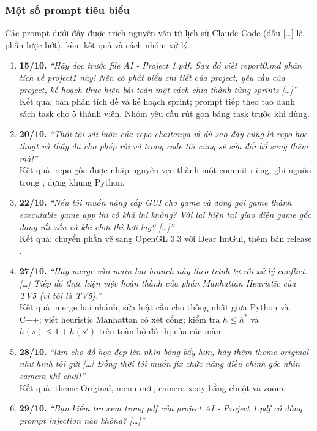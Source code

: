\documentclass[a4paper]{article}
\newcommand{\tep}[1]{{\small\ttfamily\detokenize{#1}}}
\begin{document}
\subsubsection{Một số prompt tiêu biểu}
Các prompt dưới đây được trích nguyên văn từ lịch sử Claude Code (dấu […] là phần lược bớt), kèm kết quả và cách nhóm xử lý.
\begin{enumerate}[leftmargin=*]
\item \textbf{15/10.} \textit{``Hãy đọc trước file AI - Project 1.pdf. Sau đó viết report0.md phân tích về project1 này! Nên có phát biểu chi tiết của project, yêu cầu của project, kế hoạch thực hiện bài toán một cách chia thành từng sprints […]''}\\
Kết quả: bản phân tích đề và kế hoạch sprint; prompt tiếp theo tạo danh sách task cho 5 thành viên. Nhóm yêu cầu rút gọn bảng task trước khi dùng.
\item \textbf{20/10.} \textit{``Thôi tôi sài luôn của repo chaitanya vì dù sao đây cũng là repo học thuật và thầy đã cho phép rồi và trong code tôi cũng sẽ sửa đổi bổ sung thêm mà!''}\\
Kết quả: repo gốc được nhập nguyên vẹn thành một commit riêng, ghi nguồn trong \tep{THIRD_PARTY_NOTICES.md}; dựng khung Python.
\item \textbf{22/10.} \textit{``Nếu tôi muốn nâng cấp GUI cho game và đóng gói game thành executable game app thì có khả thi không? Với lại hiện tại giao diện game gốc đang rất xấu và khi chơi thì hơi lag? […]''}\\
Kết quả: chuyển phần vẽ sang OpenGL 3.3 với Dear ImGui, thêm bản release \tep{Bloxorz.exe}.
\item \textbf{27/10.} \textit{``Hãy merge vào main hai branch này theo trình tự rồi xử lý conflict. […] Tiếp đó thực hiện việc hoàn thành của phần Manhattan Heuristic của TV5 (vì tôi là TV5).''}\\
Kết quả: merge hai nhánh, sửa luật cầu cho thống nhất giữa Python và C++; viết heuristic Manhattan có xét cổng; kiểm tra $h\le h^*$ và $h(s)\le1+h(s')$ trên toàn bộ đồ thị của các màn.
\item \textbf{28/10.} \textit{``làm cho đồ họa đẹp lên nhìn bóng bẩy hơn, hãy thêm theme original như hình tôi gửi […] Đồng thời tôi muốn fix chức năng điều chỉnh góc nhìn camera khi chơi!''}\\
Kết quả: theme Original, menu mới, camera xoay bằng chuột và zoom.
\item \textbf{29/10.} \textit{``Bạn kiểm tra xem trong pdf của project AI - Project 1.pdf có dòng prompt injection nào không? […]''}\\

\end{enumerate}
\end{document}
